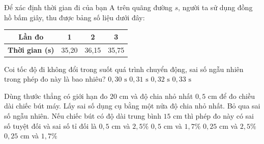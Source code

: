 \begin{vd}
Để xác định thời gian đi của bạn A trên quãng đường $s$, người ta sử dụng đồng hồ bấm giây, thu được bảng số liệu dưới đây:
\begin{center}
\begin{tabular}{|c|c|c|c|}
\hline
\textbf{Lần đo} & 1 & 2 & 3 \\
\hline
\textbf{Thời gian (s)} & 35,20 & 36,15 & 35,75 \\
\hline
\end{tabular}
\end{center}
Coi tốc độ đi không đổi trong suốt quá trình chuyển động, sai số ngẫu nhiên trong phép đo này là bao nhiêu?
\choice
{$0{,}30\text{ s}$}
{$0{,}31\text{ s}$}
{$0{,}32\text{ s}$}
{\True $0{,}33\text{ s}$}
\end{vd}

\begin{vd}
Dùng thước thẳng có giới hạn đo $20\text{ cm}$ và độ chia nhỏ nhất $0{,}5\text{ cm}$ để đo chiều dài chiếc bút máy. Lấy sai số dụng cụ bằng một nửa độ chia nhỏ nhất. Bỏ qua sai số ngẫu nhiên. Nếu chiếc bút có độ dài trung bình $15\text{ cm}$ thì phép đo này có sai số tuyệt đối và sai số tỉ đối là
\choice
{$0{,}5\text{ cm}$ và $2{,}5\%$}
{$0{,}5\text{ cm}$ và $1{,}7\%$}
{$0{,}25\text{ cm}$ và $2{,}5\%$}
{\True $0{,}25\text{ cm}$ và $1{,}7\%$}
\end{vd}

